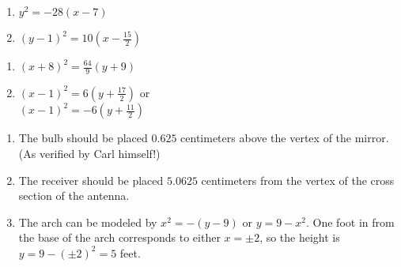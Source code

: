 \begin{multicols}{2}
\begin{enumerate}
\setcounter{enumi}{\value{HW}}

\item $y^{2} = -28(x - 7)$
\item $(y - 1)^{2} = 10\left(x - \frac{15}{2} \right)$


\setcounter{HW}{\value{enumi}}
\end{enumerate}
\end{multicols}

\begin{multicols}{2}
\begin{enumerate}
\setcounter{enumi}{\value{HW}}

\item $(x + 8)^{2} = \frac{64}{9}(y + 9)$
\item $(x - 1)^{2} = 6\left(y + \frac{17}{2}\right)$ or\\
$(x - 1)^{2} = -6\left(y + \frac{11}{2}\right)$

\setcounter{HW}{\value{enumi}}
\end{enumerate}
\end{multicols}

\begin{enumerate}
\setcounter{enumi}{\value{HW}}

\item  The bulb should be placed $0.625$ centimeters above the vertex of the mirror. (As verified by Carl himself!)

\item  The receiver should be placed $5.0625$ centimeters from the vertex of the cross section of the antenna.

\item  The arch can be modeled by $x^2=-(y-9)$ or $y=9-x^2$.  One foot in from the base of the arch corresponds to either $x = \pm 2$, so the height is $y=9-(\pm 2)^2=5$ feet.

\end{enumerate}

\closegraphsfile